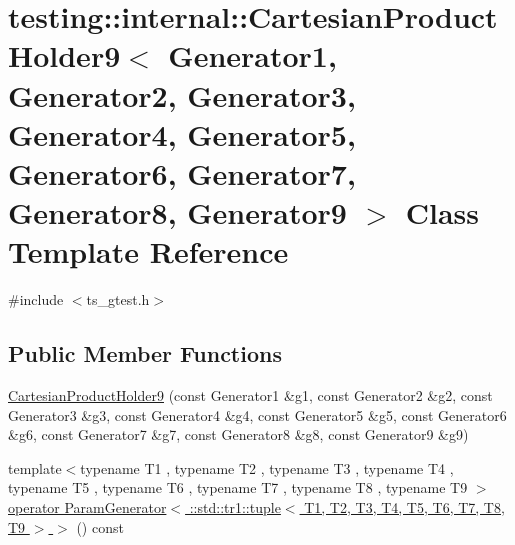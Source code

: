 \hypertarget{classtesting_1_1internal_1_1CartesianProductHolder9}{\section{testing\-:\-:internal\-:\-:Cartesian\-Product\-Holder9$<$ Generator1, Generator2, Generator3, Generator4, Generator5, Generator6, Generator7, Generator8, Generator9 $>$ Class Template Reference}
\label{classtesting_1_1internal_1_1CartesianProductHolder9}
}


{\ttfamily \#include $<$ts\-\_\-gtest.\-h$>$}

\subsection*{Public Member Functions}
\begin{DoxyCompactItemize}
\item 
\hyperlink{classtesting_1_1internal_1_1CartesianProductHolder9_a692a537863ab6adfc4001564887a3bc7}{Cartesian\-Product\-Holder9} (const Generator1 \&g1, const Generator2 \&g2, const Generator3 \&g3, const Generator4 \&g4, const Generator5 \&g5, const Generator6 \&g6, const Generator7 \&g7, const Generator8 \&g8, const Generator9 \&g9)
\item 
{\footnotesize template$<$typename T1 , typename T2 , typename T3 , typename T4 , typename T5 , typename T6 , typename T7 , typename T8 , typename T9 $>$ }\\\hyperlink{classtesting_1_1internal_1_1CartesianProductHolder9_a95a8b77d353f37fb895ac673408d4b0b}{operator Param\-Generator$<$ \-::std\-::tr1\-::tuple$<$ T1, T2, T3, T4, T5, T6, T7, T8, T9 $>$ $>$} () const 
\end{DoxyCompactItemize}



